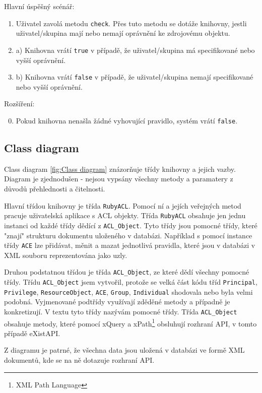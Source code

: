 Hlavní úspěšný scénář:
\begin{enumerate}
\item Uživatel zavolá metodu \verb|check|. Přes tuto metodu se dotáže knihovny, jestli uživatel/skupina mají nebo nemají oprávnění ke zdrojovému objektu.
\item a) Knihovna vrátí \verb|true| v případě, že uživatel/skupina má specifikované nebo vyšší oprávnění.
\setcounter{enumi}{1}
\item b) Knihovna vrátí \verb|false| v případě, že uživatel/skupina nemají specifikované nebo vyšší oprávnění.
\end{enumerate}
Rozšíření:
\begin{enumerate}
\setcounter{enumi}{-1}
\item Pokud knihovna nenašla žádné vyhovující pravidlo, systém vrátí \verb|false|.
\end{enumerate}


\subsection{Class diagram}
Class diagram \ref{fig:Class diagram} znázorňuje třídy knihovny a jejich vazby. Diagram je zjednodušen - nejsou vypsány všechny metody a paramatery z důvodů přehlednosti a čitelnosti. 

Hlavní třídou knihovny je třída \verb|RubyACL|. Pomocí ní a jejích veřejných metod pracuje uživatelská aplikace s ACL objekty. Třída \verb|RubyACL| obsahuje jen jednu instanci od každé třídy dědící z \verb|ACL_Object|. Tyto třídy jsou pomocné třídy, které "znají" strukturu dokumentu uloženého v databázi. Například s pomocí instance třídy \verb|ACE| lze přidávat, měnit a mazat jednotlivá pravidla, které jsou v databázi v XML souboru reprezentována jako uzly.

Druhou podstatnou třídou je třída \verb|ACL_Object|, ze které dědí všechny pomocné třídy. Třídu \verb|ACL_Object| jsem vytvořil, protože se velká část kódu tříd \verb|Principal|, \verb|Privilege|, \verb|ResourceObject|, \verb|ACE|, \verb|Group|, \verb|Individual| shodovala nebo byla velmi podobná. Vyjmenované podtřídy využívají zděděné metody a případně je konkretizují. V textu tyto třídy nazývám pomocné třídy.
Třída  \verb|ACL_Object| obsahuje metody, které pomocí xQuery a xPath\footnote{XML Path Language} obsluhují rozhraní API, v tomto případě eXistAPI.

Z diagramu je patrné, že všechna data jsou uložená v databázi ve formě XML dokumentů, kde se na ně dotazuje rozhraní API.

